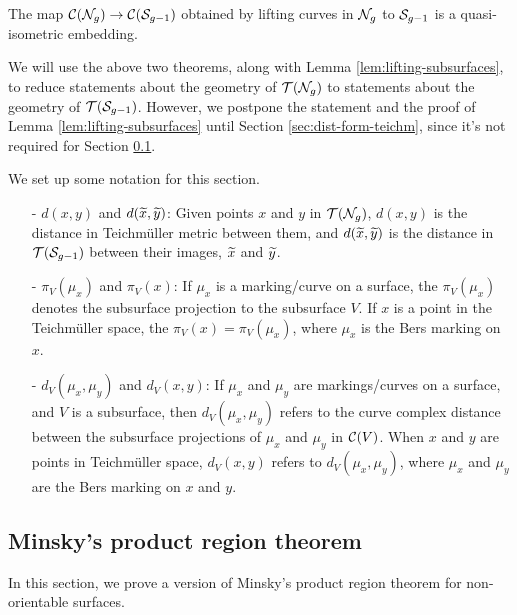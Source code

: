 \documentclass[12pt, reqno]{amsart}
\begin{document}
\begin{theorem}
  \label{thm:qi-embedding-curve-complex}
  The map $\mathcal{C}(\mathcal{N}_g) \to \mathcal{C}(\mathcal{S}_{g-1})$ obtained by lifting curves in $\mathcal{N}_g$ to $\mathcal{S}_{g-1}$ is a quasi-isometric embedding.
\end{theorem}

We will use the above two theorems, along with Lemma \ref{lem:lifting-subsurfaces}, to reduce statements about the geometry of $\mathcal{T}(\mathcal{N}_g)$ to statements about the geometry of $\mathcal{T}(\mathcal{S}_{g-1})$.
However, we postpone the statement and the proof of Lemma \ref{lem:lifting-subsurfaces} until Section \ref{sec:dist-form-teichm}, since it's not required for Section \ref{sec:minskys-prod-regi}.

We set up some notation for this section.
\begin{itemize}
\item[-] $d(x,y)$ and $d(\widetilde{x}, \widetilde{y})$: Given points $x$ and $y$ in $\mathcal{T}(\mathcal{N}_g)$, $d(x, y)$ is the distance in Teichmüller metric between them, and $d(\widetilde{x}, \widetilde{y})$ is the distance in $\mathcal{T}(\mathcal{S}_{g-1})$ between their images, $\widetilde{x}$ and $\widetilde{y}$.
\item[-] $\pi_V(\mu_x)$ and $\pi_V(x)$: If $\mu_x$ is a marking/curve on a surface, the $\pi_V(\mu_x)$ denotes the subsurface projection to the subsurface $V$. If $x$ is a point in the Teichmüller space, the $\pi_V(x) = \pi_V(\mu_x)$, where $\mu_x$ is the Bers marking on $x$.
\item[-] $d_V(\mu_x, \mu_y)$ and $d_V(x, y)$: If $\mu_x$ and $\mu_y$ are markings/curves on a surface, and $V$ is a subsurface, then $d_V(\mu_x, \mu_y)$ refers to the curve complex distance between the subsurface projections of $\mu_x$ and $\mu_y$ in $\mathcal{C}(V)$.
  When $x$ and $y$ are points in Teichmüller space, $d_V(x,y)$ refers to $d_V(\mu_x, \mu_y)$, where $\mu_x$ and $\mu_y$ are the Bers marking on $x$ and $y$.
\end{itemize}


\subsection{Minsky's product region theorem}
\label{sec:minskys-prod-regi}

In this section, we prove a version of Minsky's product region theorem \cite[Theorem 6.1]{1077244446} for non-orientable surfaces.
\end{document}
